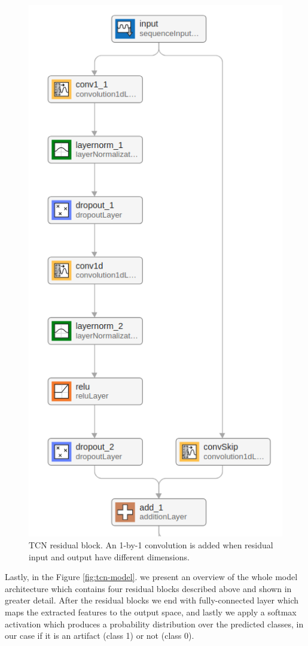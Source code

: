 \documentclass[12pt,a4paper,titlepage,openany]{report}
\begin{document}
\begin{figure}[H]
    \centering
    \includegraphics[width=0.5\linewidth]{images/Chapter3_Methodology/residual.png}
    \caption{TCN residual block. An 1-by-1 convolution is added when residual input and output have different dimensions.}
    \label{fig:residual-block}
\end{figure}

Lastly, in the Figure \ref{fig:tcn-model}. we present an overview of the whole model architecture which contains four residual blocks described above and shown in greater detail. After the residual blocks we end with fully-connected layer which maps the extracted features to the output space, and lastly we apply a softmax activation which produces a probability distribution over the predicted classes, in our case if it is an artifact (class 1) or not (class 0).
\end{document}
